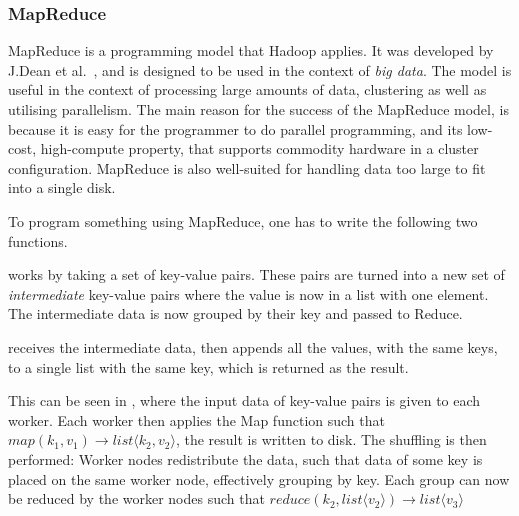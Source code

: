 \subsubsection{MapReduce}\label{sec:mapreduce_programming_model}
MapReduce is a programming model that Hadoop applies. It was developed by J.\@ Dean et al.~\cite{DeanMapReduce}, and is designed to be used in the context of \emph{big data}. The model is useful in the context of processing large amounts of data, clustering as well as utilising parallelism. The main reason for the success of the MapReduce model, is because it is easy for the programmer to do parallel programming, and its low-cost, high-compute property, that supports commodity hardware in a cluster configuration. MapReduce is also well-suited for handling data too large to fit into a single disk.

To program something using MapReduce, one has to write the following two functions. 
\begin{description}
\item[Map] works by taking a set of key-value pairs. These pairs are turned into a new set of \emph{intermediate} key-value pairs where the value is now in a list with one element. The intermediate data is now grouped by their key and passed to Reduce.
\item[Reduce] receives the intermediate data, then appends all the values, with the same keys, to a single list with the same key, which is returned as the result.
\end{description}

This can be seen in , where the input data of key-value pairs is given to each worker. Each worker then applies the Map function such that $map(k_1,v_1)\rightarrow list\langle k_2,v_2\rangle$, the result is written to disk. The shuffling is then performed: Worker nodes redistribute the data, such that data of some key is placed on the same worker node, effectively grouping by key. Each group can now be reduced by the worker nodes such that $reduce(k_2, list\langle v_2\rangle) \rightarrow list\langle v_3 \rangle$ 



